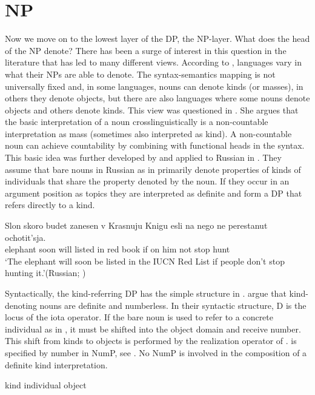 \documentclass[output=paper,
colorlinks,
citecolor=brown,
newtxmath
]{langscibook}
\begin{document}
\section{NP}

Now we move on to the lowest layer of the DP, the NP-layer. What does the head of the NP denote? There has been a surge of interest in this question in the literature that has led to many different views. According to \cite{Chierchia1998}, languages vary in what their NPs are able to denote. The syntax-semantics mapping is not universally fixed and, in some languages, nouns can denote kinds (or masses), in others they denote objects, but there are also languages where some nouns denote objects and others denote kinds. This view was questioned in \cite{Borer2005}. She argues that the basic interpretation of a noun crosslinguistically is a non-countable interpretation as mass (sometimes also interpreted as kind). A non-countable noun can achieve countability by combining with functional heads in the syntax. This basic idea was further developed by \cite{Borik.Espinal2012, Borik.Espinal2015} and applied to Russian in \cite{Borik.Espinal2012}. They assume that bare nouns in Russian as in  primarily denote properties of kinds of individuals that share the property denoted by the noun. If they occur in an argument position as topics they are interpreted as definite and form a DP that refers directly to a kind.

\ea \label{ex:20}
\gll Slon skoro budet zanesen v Krasnuju Knigu esli na nego ne perestanut ochotit'sja.\\
   elephant soon will listed in red book if on him not stop hunt\\
\glt `The elephant will soon be listed in the IUCN Red List if people don’t stop hunting it.'\hfill (Russian; \citealt[137]{Borik.Espinal2012})
\z

\noindent Syntactically, the kind-referring DP has the simple structure in . \citeauthor{Borik.Espinal2012} argue that kind-denoting nouns are definite and numberless. In their syntactic structure, D is the locus of the iota operator. If the bare noun is used to refer to a concrete individual as in , it must be shifted into the object domain and receive number. This shift from kinds to objects is performed by the realization operator  of \cite{Carlson1977}.  is specified by number in NumP, see . No NumP is involved in the composition of a definite kind interpretation.

\ea \label{ex:21}
\ea  {[\textsubscript{DP} D   [\textsubscript{NP} N]]}   \hfill kind \label{ex:21a}
 \hfill individual object \label{ex:21b}
\z \z
\end{document}
